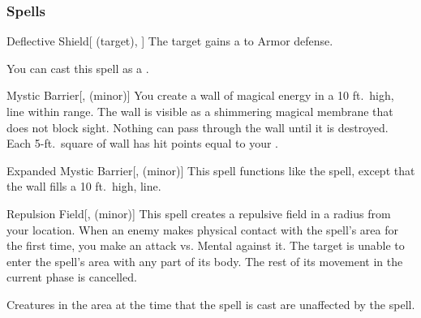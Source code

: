 \subsubsection{Spells}


\lowercase{\hypertarget{spell:Deflective Shield}{}}\label{spell:Deflective Shield}
\begin{attuneability}[Rank 1]{\hypertarget{spell:Deflective Shield}{Deflective Shield}}[ (target), ]
The target gains a   to Armor defense.

You can cast this spell as a .
\end{attuneability}
\vspace{0.25em}



\lowercase{\hypertarget{spell:Mystic Barrier}{}}\label{spell:Mystic Barrier}
\begin{freeability}[Rank 1]{\hypertarget{spell:Mystic Barrier}{Mystic Barrier}}[,  (minor)]
\targetrule
You create a wall of magical energy in a 10 ft.\ high, \areamed line within \rngmed range.
The wall is visible as a shimmering magical membrane that does not block sight.
Nothing can pass through the wall until it is destroyed.
Each 5-ft.\ square of wall has hit points equal to your .
\end{freeability}
\vspace{0.25em}



\lowercase{\hypertarget{spell:Expanded Mystic Barrier}{}}\label{spell:Expanded Mystic Barrier}
\begin{freeability}[Rank 3]{\hypertarget{spell:Expanded Mystic Barrier}{Expanded Mystic Barrier}}[,  (minor)]
\targetrule
This spell functions like the  spell, except that the wall fills a 10 ft.\ high, \arealarge line.
\end{freeability}
\vspace{0.25em}



\lowercase{\hypertarget{spell:Repulsion Field}{}}\label{spell:Repulsion Field}
\begin{freeability}[Rank 3]{\hypertarget{spell:Repulsion Field}{Repulsion Field}}[,  (minor)]
This spell creates a repulsive field in a \areamed radius  from your location.
When an enemy makes physical contact with the spell's area for the first time, you make an attack vs. Mental against it.
\hit The target is unable to enter the spell's area with any part of its body.
The rest of its movement in the current phase is cancelled.

Creatures in the area at the time that the spell is cast are unaffected by the spell.
\end{freeability}
\vspace{0.25em}



